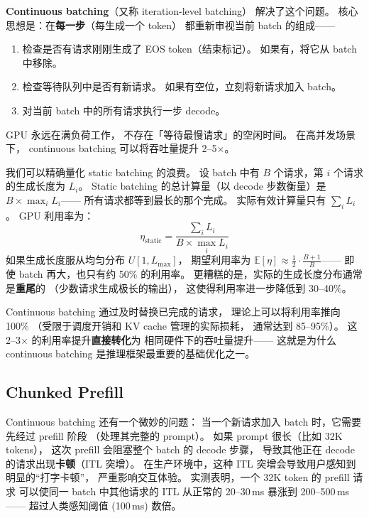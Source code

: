 \textbf{Continuous batching}（又称 iteration-level batching）
解决了这个问题。
核心思想是：在\textbf{每一步}（每生成一个 token）
都重新审视当前 batch 的组成——
\begin{enumerate}[noitemsep]
  \item 检查是否有请求刚刚生成了 EOS token（结束标记）。
        如果有，将它从 batch 中移除。
  \item 检查等待队列中是否有新请求。
        如果有空位，立刻将新请求加入 batch。
  \item 对当前 batch 中的所有请求执行一步 decode。
\end{enumerate}

GPU 永远在满负荷工作，
不存在「等待最慢请求」的空闲时间。
在高并发场景下，
continuous batching 可以将吞吐量提升 2--5$\times$。

\begin{corebox}
我们可以精确量化 static batching 的浪费。
设 batch 中有 $B$ 个请求，第 $i$ 个请求的生成长度为 $L_i$。
Static batching 的总计算量（以 decode 步数衡量）是 $B \times \max_i L_i$——
所有请求都等到最长的那个完成。
实际有效计算量只有 $\sum_i L_i$。
GPU 利用率为：
\begin{equation}
  \eta_{\text{static}} = \frac{\sum_i L_i}{B \times \max_i L_i}
\end{equation}
如果生成长度服从均匀分布 $U[1, L_{\max}]$，
期望利用率为 $\mathbb{E}[\eta] \approx \frac{1}{2} \cdot \frac{B+1}{B}$——
即使 batch 再大，也只有约 50\% 的利用率。
更糟糕的是，实际的生成长度分布通常是\textbf{重尾}的
（少数请求生成极长的输出），
这使得利用率进一步降低到 30--40\%。

Continuous batching 通过及时替换已完成的请求，
理论上可以将利用率推向 100\%
（受限于调度开销和 KV cache 管理的实际损耗，
通常达到 85--95\%）。
这 2--3$\times$ 的利用率提升\textbf{直接转化}为
相同硬件下的吞吐量提升——
这就是为什么 continuous batching
是推理框架最重要的基础优化之一。
\end{corebox}

\subsection{Chunked Prefill}

Continuous batching 还有一个微妙的问题：
当一个新请求加入 batch 时，它需要先经过 prefill 阶段
（处理其完整的 prompt）。
如果 prompt 很长（比如 32K tokens），
这次 prefill 会阻塞整个 batch 的 decode 步骤，
导致其他正在 decode 的请求出现\textbf{卡顿}（ITL 突增）。
在生产环境中，这种 ITL 突增会导致用户感知到明显的``打字卡顿''，
严重影响交互体验。
实测表明，一个 32K token 的 prefill 请求
可以使同一 batch 中其他请求的 ITL
从正常的 20--30\,ms 暴涨到 200--500\,ms——
超过人类感知阈值 (100\,ms) 数倍。

